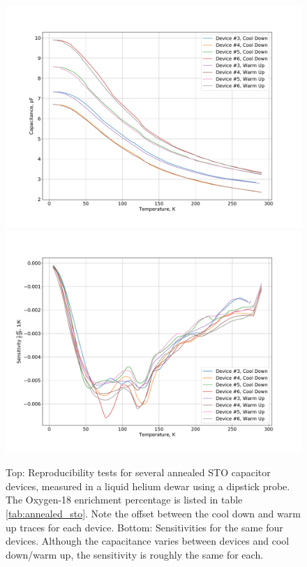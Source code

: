 \documentclass{thesis-umich}
\begin{document}
\begin{figure} \caption[Annealed STO thermometer reproducability tests]{Top: Reproducibility tests for several annealed STO
	capacitor devices, measured in a liquid helium dewar using a dipstick
	probe. The Oxygen-18 enrichment percentage is listed in table \ref{tab:annealed_sto}. Note the
offset between the cool down and warm up traces for each device. Bottom:
Sensitivities for the same four devices. Although the capacitance varies
between devices and cool down/warm up, the sensitivity is roughly the same for
each.} 
\label{fig:annealed_sto_repro}
\includegraphics[width=0.9\columnwidth]{figures/annealed_sto_c_vs_t.pdf}
\includegraphics[width=0.9\columnwidth]{figures/annealed_sto_sens_vs_t.pdf}
\end{figure}
\end{document}
